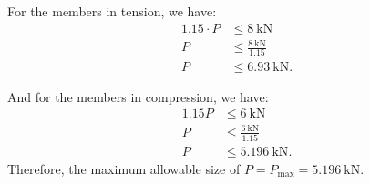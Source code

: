 \begin{derivation}
  For the members in tension, we have:
  \begin{align*}
    \num{1,15} \cdot P &\leq \qty{8}{\kN} \\
    P &\leq \frac{\qty{8}{\kN}}{\num{1,15}} \\
    P &\leq \qty{6,93}{\kN} 
  .\end{align*}
  
  And for the members in compression, we have:
  \begin{align*}
    \num{1,15} P &\leq \qty{6}{\kN} \\
    P &\leq \frac{\qty{6}{\kN}}{\num{1,15}} \\
    P &\leq \qty{5,196}{\kN}
  .\end{align*}
  Therefore, the maximum allowable size of $P = P_{\mathrm{max}} = \qty{5,196}{\kN}$.
\end{derivation}

